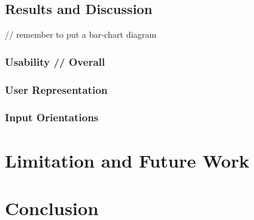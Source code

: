 \documentclass{sigchi}
\begin{document}
\subsection{Results and Discussion} 
// remember to put a bar-chart diagram
\subsubsection{Usability // Overall}
\subsubsection{User Representation}
\subsubsection{Input Orientations}


\section{Limitation and Future Work}

\section{Conclusion}




\end{document}
